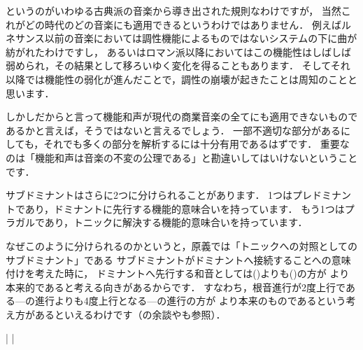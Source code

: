\documentclass[dvipdfmx,uplatex,b5paper,openany,jbase=12Q,nomag*,textwidth-limit=44%
               ]{gachimuchi}[2020/05/05]
\begin{document}
\begin{Yodan}
というのがいわゆる古典派の音楽から導き出された規則なわけですが，
当然これがどの時代のどの音楽にも適用できるというわけではありません．
例えばルネサンス以前の音楽においては調性機能によるものではないシステムの下に曲が紡がれたわけですし，
あるいはロマン派以降においてはこの機能性はしばしば弱められ，その結果として移ろいゆく変化を得ることもあります．
そしてそれ以降では機能性の弱化が進んだことで，調性の崩壊が起きたことは周知のことと思います．

しかしだからと言って機能和声が現代の商業音楽の全てにも適用できないものであるかと言えば，そうではないと言えるでしょう．
一部不適切な部分があるにしても，それでも多くの部分を解析するには十分有用であるはずです．
重要なのは「機能和声は音楽の不変の公理である」と勘違いしてはいけないということです．
\end{Yodan}
\begin{Yodan}
サブドミナントはさらに2つに分けられることがあります．
1つはプレドミナントであり，ドミナントに先行する機能的意味合いを持っています．
もう1つはプラガルであり，トニックに解決する機能的意味合いを持っています．

なぜこのように分けられるのかというと，原義では「トニックへの対照としてのサブドミナント」である
サブドミナントがドミナントへ接続することへの意味付けを考えた時に，
ドミナントへ先行する和音としては\Gniv(\Gniv\Min)よりも\Gnii\Min(\Gnii\Dimt)の方が
より本来的であると考える向きがあるからです．
すなわち，根音進行が2度上行である\Gniv---\Gnv の進行よりも4度上行となる\Gnii\Min---\Gnv の進行の方が
より本来のものであるという考え方があるといえるわけです（の余談やも参照）．
\begin{Music}
  \Startpiece
  \NOTes%
  |%
  \en\doublebar%
  \NOTes%
  |%
  \en\setdoublebar%
  \endpiece
\end{Music}
\end{Yodan}
\end{document}

